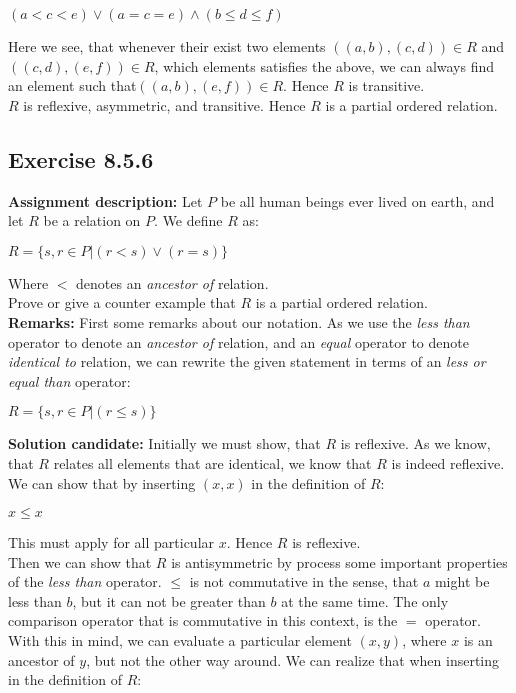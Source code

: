 \documentclass{report}
\newcommand{\cent}[1]{\begin{center}#1\end{center}}
\newcommand{\In}{\! \in \!}
\newcommand{\AssignmentDescription}{\textbf{Assignment description: }}
\newcommand{\myRemark}{\textbf{Remarks: }}
\newcommand{\Solution}{\textbf{Solution candidate: }}
\newcommand{\QED}{\boxed{}}
\newcommand{\Exercise}[1]{\subsection{Exercise #1}}
\begin{document}
	\cent{$(a < c < e) \vee (a = c = e) \wedge (b \leq d \leq f)$}
	
	Here we see, that whenever their exist two elements $((a,b),(c,d)) \In R$ and $((c,d),(e,f)) \In R$, which elements satisfies the above, we can always find an element such that$((a,b),(e,f)) \In R$. Hence $R$ is transitive.\\
	
	$R$ is reflexive, asymmetric, and transitive. Hence $R$ is a partial ordered relation.\\
	\QED
	
	\Exercise{8.5.6}
	
	\AssignmentDescription
	Let $P$ be all human beings ever lived on earth, and let $R$ be a relation on $P$. We define $R$ as:
	
	\cent{$R = \{s,r \In P | (r < s) \vee (r = s)\}$}
	
	Where $<$ denotes an \textit{ancestor of} relation.\\
	
	Prove or give a counter example that $R$ is a partial ordered relation.\\
	
	\myRemark
	First some remarks about our notation. As we use the \textit{less than} operator to denote an \textit{ancestor of} relation, and an \textit{equal} operator to denote \textit{identical to} relation, we can rewrite the given statement in terms of an \textit{less or equal than} operator:
	
	\cent{$R = \{s,r \In P | (r \leq s)\}$}
	
	\Solution
	Initially we must show, that $R$ is reflexive. As we know, that $R$ relates all elements that are identical, we know that $R$ is indeed reflexive. We can show that by inserting $ (x,x) $ in the definition of $R$:
	
	\cent{$x \leq x$}
	
	This must apply for all particular $x$. Hence $R$ is reflexive.\\
	
	Then we can show that $R$ is antisymmetric by process some important properties of the \textit{less than} operator. $\leq$ is not commutative in the sense, that $a$ might be less than $b$, but it can not be greater than $b$ at the same time. The only comparison operator that is commutative in this context, is the $=$ operator. With this in mind, we can evaluate a particular element $(x,y)$, where $x$ is an ancestor of $y$, but not the other way around. We can realize that when inserting in the definition of $R$:
	
\end{document}
